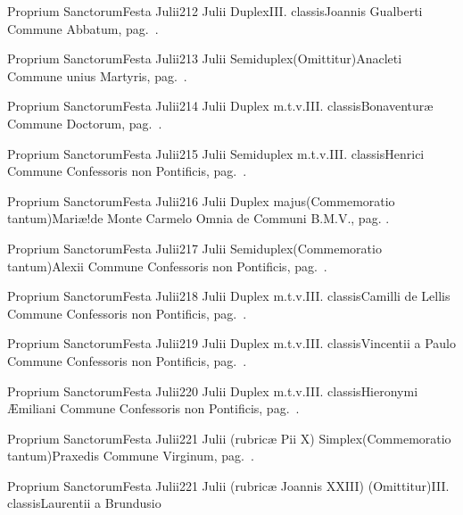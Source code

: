 \documentclass[nocturnale-romanum.tex]{subfiles}
\begin{document}
	{Proprium Sanctorum}{Festa Julii}{2}{12 Julii}
	{Duplex}{III. classis}{Joannis Gualberti}
	{Commune Abbatum, pag.\ \pageref{M-COAB}.}
	{}

	{Proprium Sanctorum}{Festa Julii}{2}{13 Julii}
	{Semiduplex}{(Omittitur)}{Anacleti}
	{Commune unius Martyris, pag.\ \pageref{M-UMEX}.}
	{}

	{Proprium Sanctorum}{Festa Julii}{2}{14 Julii}
	{Duplex m.t.v.}{III. classis}{Bonaventuræ}
	{Commune Doctorum, pag.\ \pageref{M-CODO}.}
	{}

	{Proprium Sanctorum}{Festa Julii}{2}{15 Julii}
	{Semiduplex m.t.v.}{III. classis}{Henrici}
	{Commune Confessoris non Pontificis, pag.\ \pageref{M-CONP}.}
	{}

	{Proprium Sanctorum}{Festa Julii}{2}{16 Julii}
	{Duplex majus}{(Commemoratio tantum)}{Mariæ!de Monte Carmelo}
	{Omnia de Communi B.M.V., pag. \pageref{M-CBMV}.}
	{}

	{Proprium Sanctorum}{Festa Julii}{2}{17 Julii}
	{Semiduplex}{(Commemoratio tantum)}{Alexii}
	{Commune Confessoris non Pontificis, pag.\ \pageref{M-CONP}.}
	{}

	{Proprium Sanctorum}{Festa Julii}{2}{18 Julii}
	{Duplex m.t.v.}{III. classis}{Camilli de Lellis}
	{Commune Confessoris non Pontificis, pag.\ \pageref{M-CONP}.}
	{}

	{Proprium Sanctorum}{Festa Julii}{2}{19 Julii}
	{Duplex m.t.v.}{III. classis}{Vincentii a Paulo}
	{Commune Confessoris non Pontificis, pag.\ \pageref{M-CONP}.}
	{}

	{Proprium Sanctorum}{Festa Julii}{2}{20 Julii}
	{Duplex m.t.v.}{III. classis}{Hieronymi Æmiliani}
	{Commune Confessoris non Pontificis, pag.\ \pageref{M-CONP}.}
	{}

	{Proprium Sanctorum}{Festa Julii}{2}{21 Julii (rubricæ Pii X)}
	{Simplex}{(Commemoratio tantum)}{Praxedis}
	{Commune Virginum, pag.\ \pageref{M-MU}.}
	{}

	{Proprium Sanctorum}{Festa Julii}{2}{21 Julii (rubricæ Joannis XXIII)}
	{(Omittitur)}{III. classis}{Laurentii a Brundusio}
	{}
	{}
\end{document}
